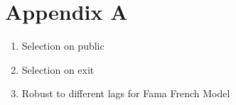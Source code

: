 \chapter{Appendix A\label{apndxA}}

\begin{enumerate}
  \item Selection on public
  \item Selection on exit
  \item Robust to different lags for Fama French Model
\end{enumerate}

